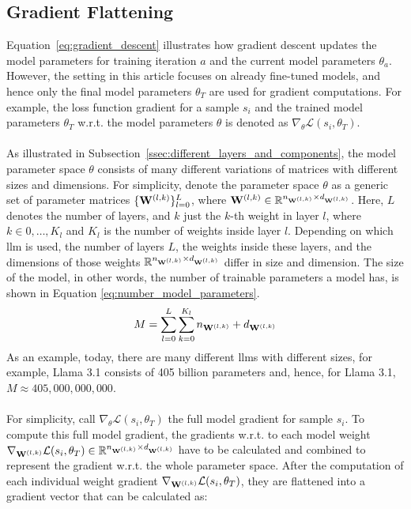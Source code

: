\subsection{Gradient Flattening}
Equation~\ref{eq:gradient_descent} illustrates how gradient descent updates the model parameters for training iteration $a$ and the current model parameters $\theta_a$. However, the setting in this article focuses on already fine-tuned models, and hence only the final model parameters $\theta_T$ are used for gradient computations. For example, the loss function gradient for a sample $s_i$ and the trained model parameters $\theta_T$ w.r.t. the model parameters $\theta$ is denoted as $\nabla_{\theta} \mathcal{L}(s_i, \theta_T)$.
\\\\
As illustrated in Subsection~\ref{ssec:different_layers_and_components}, the model parameter space $\theta$ consists of many different variations of matrices with different sizes and dimensions. For simplicity, denote the parameter space $\theta$ as a generic set of parameter matrices
$\{\mathbf{W}^{(l,k)}\}_{l=0}^L$, where $\mathbf{W}^{(l,k)} \in \mathbb{R}^{n_{\mathbf{W}^{(l,k)}} \times d_{\mathbf{W}^{(l,k)}}}$. Here, $L$ denotes the number of layers, and $k$ just the $k$-th weight in layer $l$, where $k \in 0,\dots,K_l$ and $K_l$ is the number of weights inside layer $l$. Depending on which \acrshort{llm} is used, the number of layers $L$, the weights inside these layers, and the dimensions of those weights $\mathbb{R}^{n_{\mathbf{W}^{(l,k)}} \times d_{\mathbf{W}^{(l,k)}}}$ differ in size and dimension. The size of the model, in other words, the number of trainable parameters a model has, is shown in Equation \ref{eq:number_model_parameters}.
\begin{equation}
    M = \sum_{l=0}^{L} \sum_{k=0}^{K_l} n_{\mathbf{W}^{(l,k)}} + d_{\mathbf{W}^{(l,k)}}
    \label{eq:number_model_parameters}
\end{equation}
As an example, today, there are many different \acrlong{llm}s with different sizes, for example, Llama 3.1 consists of 405 billion parameters \cite{grattafiori2024llama3herdmodels} and, hence, for Llama 3.1, $M \approx 405,000,000,000$.
\\\\
For simplicity, call $\nabla_{\theta} \mathcal{L}(s_i, \theta_T)$ the full model gradient for sample $s_i$. To compute this full model gradient, the gradients w.r.t. to each model weight $\nabla_{\mathbf{W}^{(l,k)}} \mathcal{L}(s_i, \theta_T) \in \mathbb{R}^{n_{\mathbf{W}^{(l,k)}} \times d_{\mathbf{W}^{(l,k)}}}$ have to be calculated and combined to represent the gradient w.r.t. the whole parameter space. After the computation of each individual weight gradient $\nabla_{\mathbf{W}^{(l,k)}} \mathcal{L}(s_i, \theta_T)$, they are flattened into a gradient vector that can be calculated as: 
